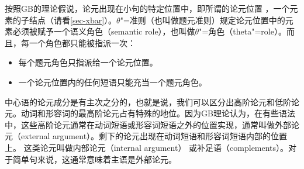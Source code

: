 按照GB的理论假说，论元出现在小句的特定位置中，即所谓的论元位置 ，\egc 一个\xnullc 元素的子结点（请看\ref{sec-xbar}）。$\theta$"=准则（也叫做题元准则）规定论元位置中的元素必须被赋予一个语义角色（semantic role），也叫做$\theta$"=角色（theta"=role）。而且，每一个角色都只能被指派一次\citep[]{Chomsky81a}：
\begin{principle-break}[$\theta$"=准则]\label{theta-Kriterium}
\begin{itemize}
\item 每个题元角色只指派给一个论元位置。
\item 一个论元位置内的任何短语只能充当一个题元角色。
\end{itemize}
\end{principle-break}
\noindent
%

中心语的论元成分是有主次之分的，也就是说，我们可以区分出高阶论元和低阶论元。动词和形容词的最高阶论元占有特殊的地位。因为GB理论认为，在有些语法中，这些高阶论元通常在动词短语或形容词短语之外的位置实现，通常叫做外部论元（external argument）。剩下的论元出现在动词短语和形容词短语内部的位置上。
  这类论元叫做内部论元（internal argument） 或补足语（complements）。对于简单句来说，这通常意味着主语是外部论元。

